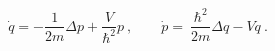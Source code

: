 \begin{equation}
\dot{q}=-{\frac{1}{2m}}\Delta p+{\frac{V}{\hbar ^{2}}}p\ ,\qquad \dot{p}={\ 
\frac{\hbar ^{2}}{2m}}\Delta q-Vq\ .  \label{Schrodreim}
\end{equation}%
